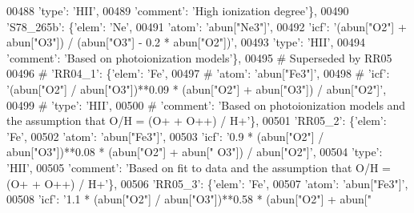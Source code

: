 \begin{DoxyCode}
00488                                    \textcolor{stringliteral}{'type'}: \textcolor{stringliteral}{'HII'},
00489                                    \textcolor{stringliteral}{'comment'}: \textcolor{stringliteral}{'High ionization degree'}\},
00490                          \textcolor{stringliteral}{'S78\_265b'}: \{\textcolor{stringliteral}{'elem'}: \textcolor{stringliteral}{'Ne'},
00491                                       \textcolor{stringliteral}{'atom'}: \textcolor{stringliteral}{'abun["Ne3"]'},
00492                                       \textcolor{stringliteral}{'icf'}: \textcolor{stringliteral}{'(abun["O2"] + abun["O3"]) / (abun["O3"] - 0.2 * abun["O2"])'},
00493                                       \textcolor{stringliteral}{'type'}: \textcolor{stringliteral}{'HII'},
00494                                       \textcolor{stringliteral}{'comment'}: \textcolor{stringliteral}{'Based on photoionization models'}\},
00495 \textcolor{comment}{# Superseded by RR05}
00496 \textcolor{comment}{#                         'RR04\_1': \{'elem': 'Fe',}
00497 \textcolor{comment}{#                                      'atom': 'abun["Fe3"]',}
00498 \textcolor{comment}{#                                      'icf': '(abun["O2"] / abun["O3"])**0.09 * (abun["O2"] + abun["O3"])
       / abun["O2"]',}
00499 \textcolor{comment}{#                                      'type': 'HII',}
00500 \textcolor{comment}{#                                      'comment': 'Based on photoionization models and the assumption that
       O/H = (O+ + O++) / H+'\},}
00501                          \textcolor{stringliteral}{'RR05\_2'}: \{\textcolor{stringliteral}{'elem'}: \textcolor{stringliteral}{'Fe'},
00502                                       \textcolor{stringliteral}{'atom'}: \textcolor{stringliteral}{'abun["Fe3"]'},
00503                                       \textcolor{stringliteral}{'icf'}: \textcolor{stringliteral}{'0.9 * (abun["O2"] / abun["O3"])**0.08 * (abun["O2"] + abun["
      O3"]) / abun["O2"]'},
00504                                       \textcolor{stringliteral}{'type'}: \textcolor{stringliteral}{'HII'},
00505                                       \textcolor{stringliteral}{'comment'}: \textcolor{stringliteral}{'Based on fit to data and the assumption that O/H = (O+ +
       O++) / H+'}\},
00506                          \textcolor{stringliteral}{'RR05\_3'}: \{\textcolor{stringliteral}{'elem'}: \textcolor{stringliteral}{'Fe'},
00507                                       \textcolor{stringliteral}{'atom'}: \textcolor{stringliteral}{'abun["Fe3"]'},
00508                                       \textcolor{stringliteral}{'icf'}: \textcolor{stringliteral}{'1.1 * (abun["O2"] / abun["O3"])**0.58 * (abun["O2"] + abun["
}
\end{DoxyCode}
